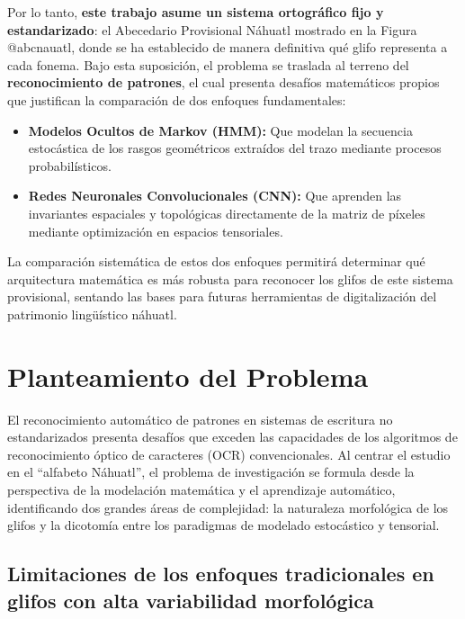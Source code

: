 \documentclass[
  spanish,
  us-letterpaper,
  DIV=11,
  numbers=noendperiod]{scrreprt}
\begin{document}
Por lo tanto, \textbf{este trabajo asume un sistema ortográfico fijo y
estandarizado}: el Abecedario Provisional Náhuatl mostrado en la Figura
@abcnauatl, donde se ha establecido de manera definitiva qué glifo
representa a cada fonema. Bajo esta suposición, el problema se traslada
al terreno del \textbf{reconocimiento de patrones}, el cual presenta
desafíos matemáticos propios que justifican la comparación de dos
enfoques fundamentales:

\begin{itemize}
\item
  \textbf{Modelos Ocultos de Markov (HMM):} Que modelan la secuencia
  estocástica de los rasgos geométricos extraídos del trazo mediante
  procesos probabilísticos.
\item
  \textbf{Redes Neuronales Convolucionales (CNN):} Que aprenden las
  invariantes espaciales y topológicas directamente de la matriz de
  píxeles mediante optimización en espacios tensoriales.
\end{itemize}

La comparación sistemática de estos dos enfoques permitirá determinar
qué arquitectura matemática es más robusta para reconocer los glifos de
este sistema provisional, sentando las bases para futuras herramientas
de digitalización del patrimonio lingüístico náhuatl.

\section{Planteamiento del Problema}\label{planteamiento-del-problema}

El reconocimiento automático de patrones en sistemas de escritura no
estandarizados presenta desafíos que exceden las capacidades de los
algoritmos de reconocimiento óptico de caracteres (OCR) convencionales.
Al centrar el estudio en el ``alfabeto Náhuatl'', el problema de
investigación se formula desde la perspectiva de la modelación
matemática y el aprendizaje automático, identificando dos grandes áreas
de complejidad: la naturaleza morfológica de los glifos y la dicotomía
entre los paradigmas de modelado estocástico y tensorial.

\subsection{Limitaciones de los enfoques tradicionales en glifos con
alta variabilidad
morfológica}\label{limitaciones-de-los-enfoques-tradicionales-en-glifos-con-alta-variabilidad-morfoluxf3gica}
\end{document}
